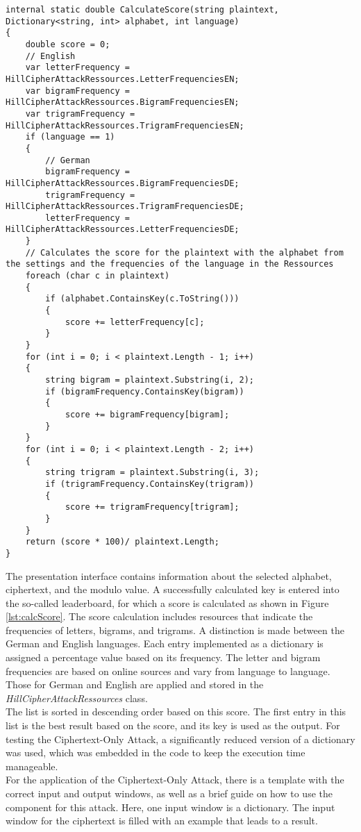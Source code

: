 \documentclass[conference]{IEEEtran}
\begin{document}
\begin{lstlisting}[caption={CalculateScore method}, label={lst:calcScore}]
internal static double CalculateScore(string plaintext, Dictionary<string, int> alphabet, int language)
{
    double score = 0;
    // English
    var letterFrequency = HillCipherAttackRessources.LetterFrequenciesEN;
    var bigramFrequency = HillCipherAttackRessources.BigramFrequenciesEN;
    var trigramFrequency = HillCipherAttackRessources.TrigramFrequenciesEN;
    if (language == 1)
    {
        // German
        bigramFrequency = HillCipherAttackRessources.BigramFrequenciesDE;
        trigramFrequency = HillCipherAttackRessources.TrigramFrequenciesDE;
        letterFrequency = HillCipherAttackRessources.LetterFrequenciesDE;
    }
    // Calculates the score for the plaintext with the alphabet from the settings and the frequencies of the language in the Ressources
    foreach (char c in plaintext)
    {
        if (alphabet.ContainsKey(c.ToString()))
        {
            score += letterFrequency[c];
        }
    }
    for (int i = 0; i < plaintext.Length - 1; i++)
    {
        string bigram = plaintext.Substring(i, 2);
        if (bigramFrequency.ContainsKey(bigram))
        {
            score += bigramFrequency[bigram];
        }
    }
    for (int i = 0; i < plaintext.Length - 2; i++)
    {
        string trigram = plaintext.Substring(i, 3);
        if (trigramFrequency.ContainsKey(trigram))
        {
            score += trigramFrequency[trigram];
        }
    }
    return (score * 100)/ plaintext.Length;
}
\end{lstlisting}

The presentation interface contains information about the selected alphabet, ciphertext, and the modulo value. A successfully calculated key is entered into the so-called leaderboard, for which a score is calculated as shown in Figure  \ref{lst:calcScore}. 
The score calculation includes resources that indicate the frequencies of letters, bigrams, and trigrams. A distinction is made between the German and English languages. Each entry implemented as a dictionary is assigned a percentage value based on its frequency. The letter and bigram frequencies are based on online sources \cite{b6} and vary from language to language. Those for German and English are applied and stored in the  \textit{HillCipherAttackRessources} class.
\\
The list is sorted in descending order based on this score. The first entry in this list is the best result based on the score, and its key is used as the output. For testing the Ciphertext-Only Attack, a significantly reduced version of a dictionary was used, which was embedded in the code to keep the execution time manageable.
\\
For the application of the Ciphertext-Only Attack, there is a template with the correct input and output windows, as well as a brief guide on how to use the component for this attack. Here, one input window is a dictionary. The input window for the ciphertext is filled with an example that leads to a result.
\\
\end{document}
